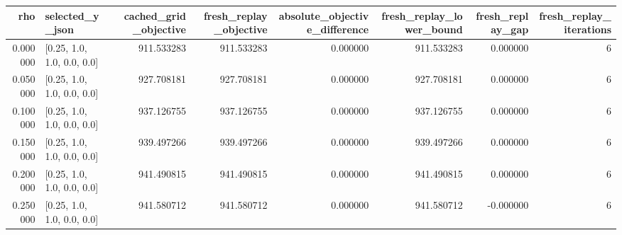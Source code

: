 \begin{tabular}{rlrrrrrr}
\toprule
rho & selected\_y\_json & cached\_grid\_objective & fresh\_replay\_objective & absolute\_objective\_difference & fresh\_replay\_lower\_bound & fresh\_replay\_gap & fresh\_replay\_iterations \\
\midrule
0.000000 & [0.25, 1.0, 1.0, 0.0, 0.0] & 911.533283 & 911.533283 & 0.000000 & 911.533283 & 0.000000 & 6 \\
0.050000 & [0.25, 1.0, 1.0, 0.0, 0.0] & 927.708181 & 927.708181 & 0.000000 & 927.708181 & 0.000000 & 6 \\
0.100000 & [0.25, 1.0, 1.0, 0.0, 0.0] & 937.126755 & 937.126755 & 0.000000 & 937.126755 & 0.000000 & 6 \\
0.150000 & [0.25, 1.0, 1.0, 0.0, 0.0] & 939.497266 & 939.497266 & 0.000000 & 939.497266 & 0.000000 & 6 \\
0.200000 & [0.25, 1.0, 1.0, 0.0, 0.0] & 941.490815 & 941.490815 & 0.000000 & 941.490815 & 0.000000 & 6 \\
0.250000 & [0.25, 1.0, 1.0, 0.0, 0.0] & 941.580712 & 941.580712 & 0.000000 & 941.580712 & -0.000000 & 6 \\
\bottomrule
\end{tabular}
